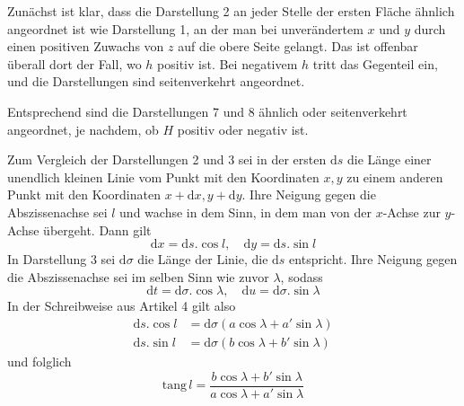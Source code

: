 Zunächst ist klar, dass die Darstellung 2 an jeder Stelle der ersten Fläche ähnlich angeordnet ist wie Darstellung 1, an der man bei unverändertem \(x\) und \(y\) durch einen positiven Zuwachs von \(z\) auf die obere Seite gelangt. Das ist offenbar überall dort der Fall, wo \(h\) positiv ist. Bei negativem \(h\) tritt das Gegenteil ein, und die Darstellungen sind seitenverkehrt angeordnet.

Entsprechend sind die Darstellungen 7 und 8 ähnlich oder seitenverkehrt angeordnet, je nachdem, ob \(H\) positiv oder negativ ist.

Zum Vergleich der Darstellungen 2 und 3 sei in der ersten \(\mathrm{d}s\) die Länge einer unendlich kleinen Linie vom Punkt mit den Koordinaten \(x,y\) zu einem anderen Punkt mit den Koordinaten \(x+\mathrm{d}x,y+\mathrm{d}y\). Ihre Neigung gegen die Abszissenachse sei \(l\) und wachse in dem Sinn, in dem man von der \(x\)-Achse zur \(y\)-Achse übergeht. Dann gilt
\[
\mathrm{d}x=\mathrm{d}s\mathord{.}\cos l,\quad \mathrm{d}y=\mathrm{d}s\mathord{.}\sin l
\]
\noindent In Darstellung 3 sei \(\mathrm{d}\sigma\) die Länge der Linie, die \(\mathrm{d}s\) entspricht. Ihre Neigung gegen die Abszissenachse sei im selben Sinn wie zuvor \(\lambda\), sodass
\[
\mathrm{d}t=\mathrm{d}\sigma\mathord{.}\cos\lambda,\quad \mathrm{d}u=\mathrm{d}\sigma\mathord{.}\sin\lambda
\]
\noindent In der Schreibweise aus Artikel 4 gilt also
\[
\begin{aligned}
\mathrm{d}s\mathord{.}\cos l&=\mathrm{d}\sigma(a\cos\lambda+a'\sin\lambda)\\
\mathrm{d}s\mathord{.}\sin l&=\mathrm{d}\sigma(b\cos\lambda+b'\sin\lambda)
\end{aligned}
\]
\noindent und folglich
\[
\mathrm{tang}\,l=\frac{b\cos\lambda+b'\sin\lambda}{a\cos\lambda+a'\sin\lambda}
\]
